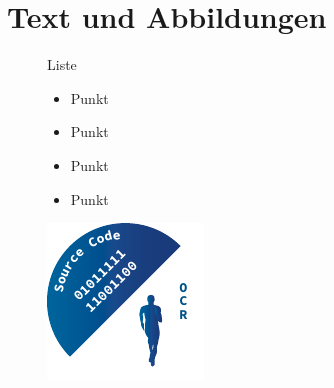 \section*{Text und Abbildungen}%
	\begin{figure}[!h]%
		\centering
		\begin{minipage}[c]{0.45\textwidth}
			Liste
			\begin{itemize} 
				\item Punkt
				\item Punkt
				\item Punkt
				\item Punkt
			\end{itemize}
		\end{minipage}
		\hfill
		\begin{minipage}[c]{0.45\textwidth}
			\includegraphics[width=\textwidth]{images/Logo/Logo2}%
		\end{minipage}
	\end{figure}



